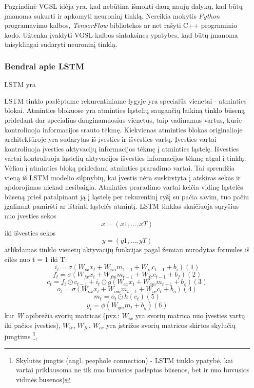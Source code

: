 \documentclass{VUMIFInfBakalaurinis}
\begin{document}
Pagrindinė VGSL idėja yra, kad nebūtina išmokti daug naujų dalykų, kad būtų įmanoma sukurti ir apkomyti neuroninį tinklą.
Nereikia mokytis \textit{Python} programavimo kalbos, \textit{TensorFlow} bibliotekos ar net rašyti C++ programinio kodo.
Užtenka įvaldyti VGSL kalbos sintaksines ypatybes, kad būtų įmanoma taisyklingai sudaryti neuroninį tinklą.

\subsubsection{Bendrai apie LSTM}
LSTM yra 

LSTM tinklo paslėptame rekurentiniame lygyje yra specialūs vienetai - atminties blokai.
Atminties blokuose yra atminties ląstelių saugančių laikiną tinklo būseną pridedant dar specialius 
dauginamuosius vienetus, taip vadinamus vartus, kurie kontroliuoja informacijos srauto tėkmę.
Kiekvienas atminties blokas originalioje architektūroje yra sudarytas iš įvesties ir išvesties vartų.
Įvesties vartai kontroliuoja įvesties aktyvacijų informacijos tėkmę į atminties ląstelę.
Išvesties vartai kontroliuoja ląstelių aktyvacijos išvesties informacijos tėkmę atgal į tinklą.
Vėliau į atminties bloką pridedami atminties praradimo vartai. 
Tai sprendžia vieną iš LSTM modelio silpnybių, kai įvestis nėra suskirstyta į atskiras sekas ir apdorojimas niekad nesibaigia.
Atminties praradimo vartai keičia vidinę ląstelės būseną prieš patalpinant ją į ląstelę per rekurentinį ryšį su pačia savim,
tuo pačiu įgalinant pamiršti ar ištrinti ląstelės atmintį.
LSTM tinklas skaičiuoja sąryšius nuo įvesties sekos
\begin{equation*}
  x = (x1, ..., xT) 
\end{equation*}
iki išvesties sekos
\begin{equation*}
  y = (y1, ..., yT)
\end{equation*}
atlikdamas tinklo vienetų aktyvacijų funkcijas pagal žemiau nurodytas formules iš eilės nuo t = 1 iki T:
\[i_t = \sigma(W_{ix}x_t + W_{im}m_{t−1} + W_{ic}c_{t−1} + b_i) (1)\]
\[f_t = \sigma(W_{fx}x_t + W_{fm}m_{t−1} + W_{fc}c_{t−1} + b_f) (2)\]
\[c_t = f_t \odot c_{t−1} + i_t\odot g(W_{cx}x_t + W_{cm}m_{t−1} + b_c) (3)\]
\[o_t = \sigma(W_{ox}x_t + W_{om}m_{t−1} + W_{oc}c_t + b_o) (4)\]
\[m_t = o_t \odot h(c_t) (5)\]
\[y_t = \phi(W_{ym}m_t + b_y) (6)\]
kur \textit{W} apibrėžia svorių matricas (pvz.: \(W_{ix}\) yra svorių matrica nuo įvesties vartų iki pačios įvesties), 
\(W_{ic}\), \(W_{fc}\), \(W_{oc}\) yra įstrižos svorių matricos skirtos skylučių jungtims
\footnote{Skylutės jungtis (angl. peephole connection) - LSTM tinklo ypatybė, kai vartai priklausoma ne tik nuo buvusios paslėptos būsenos, bet ir nuo buvusios vidinės būsenos)},
\end{document}
